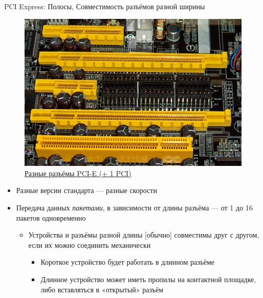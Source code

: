 \documentclass[xetex,aspectratio=43]{beamer}
\begin{document}
\begin{frame}{PCI Express: Полосы, Совместимость разъёмов разной ширины}
	\begin{figure}
        \includegraphics[height=0.5\textheight]{img/04.PCI-E_PCI_slots.jpg}
        \caption{\href{https://en.wikipedia.org/wiki/PCI_Express}{Разные разъёмы PCI-E (+ 1 PCI)}}
    \end{figure}
    \begin{itemize}
        \item Разные версии стандарта --- разные скорости
        \item Передача данных \emph{пакетами}, в зависимости от длины разъёма --- от 1 до 16 пакетов одновременно
        \begin{itemize}
            \item Устройства и разъёмы разной длины [обычно] совместимы друг с другом, если их можно соединить механически
            \begin{itemize}
                \item Короткое устройство будет работать в длинном разъёме
                \item Длинное устройство может иметь пропилы на контактной площадке, либо вставляться в «открытый» разъём
            \end{itemize}
        \end{itemize}
    \end{itemize}
\end{frame}
\end{document}
